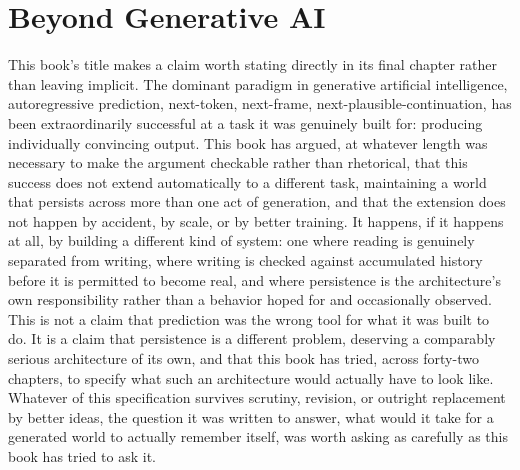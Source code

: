 \section{Beyond Generative AI}

This book's title makes a claim worth stating directly in its final chapter rather than leaving implicit. The dominant paradigm in generative artificial intelligence, autoregressive prediction, next-token, next-frame, next-plausible-continuation, has been extraordinarily successful at a task it was genuinely built for: producing individually convincing output. This book has argued, at whatever length was necessary to make the argument checkable rather than rhetorical, that this success does not extend automatically to a different task, maintaining a world that persists across more than one act of generation, and that the extension does not happen by accident, by scale, or by better training. It happens, if it happens at all, by building a different kind of system: one where reading is genuinely separated from writing, where writing is checked against accumulated history before it is permitted to become real, and where persistence is the architecture's own responsibility rather than a behavior hoped for and occasionally observed. This is not a claim that prediction was the wrong tool for what it was built to do. It is a claim that persistence is a different problem, deserving a comparably serious architecture of its own, and that this book has tried, across forty-two chapters, to specify what such an architecture would actually have to look like. Whatever of this specification survives scrutiny, revision, or outright replacement by better ideas, the question it was written to answer, what would it take for a generated world to actually remember itself, was worth asking as carefully as this book has tried to ask it.
